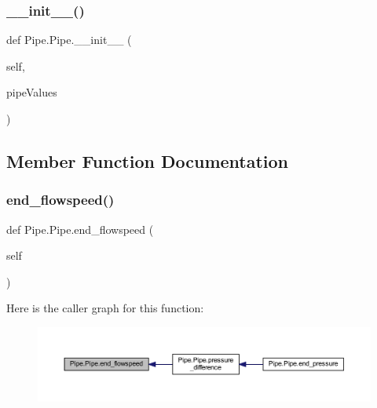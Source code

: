 \subsubsection{\texorpdfstring{\+\_\+\+\_\+init\+\_\+\+\_\+()}{\_\_init\_\_()}}
{\footnotesize\ttfamily def Pipe.\+Pipe.\+\_\+\+\_\+init\+\_\+\+\_\+ (\begin{DoxyParamCaption}\item[{}]{self,  }\item[{}]{pipe\+Values }\end{DoxyParamCaption})}



\subsection{Member Function Documentation}
\mbox{\label{class_pipe_1_1_pipe_abab09825864d4997d16ffc1dcdbfcf97}} 
\subsubsection{\texorpdfstring{end\+\_\+flowspeed()}{end\_flowspeed()}}
{\footnotesize\ttfamily def Pipe.\+Pipe.\+end\+\_\+flowspeed (\begin{DoxyParamCaption}\item[{}]{self }\end{DoxyParamCaption})}

Here is the caller graph for this function\+:
\nopagebreak
\begin{figure}[H]
\begin{center}
\leavevmode
\includegraphics[width=350pt]{class_pipe_1_1_pipe_abab09825864d4997d16ffc1dcdbfcf97_icgraph}
\end{center}
\end{figure}
\mbox{\label{class_pipe_1_1_pipe_a93aa9c0dd790f2014d2c403b23164646}} 
